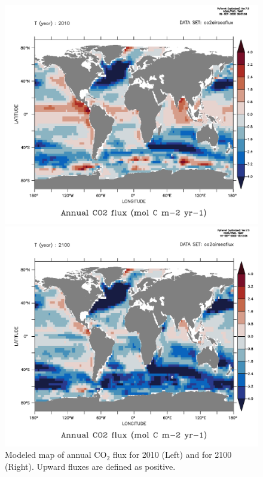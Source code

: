 \documentclass[a4paper]{article}
\begin{document}
\begin{enumerate}
\begin{figure}[h!]   %
   \centering
   \begin{minipage}{0.45\columnwidth}
      \centering
      \includegraphics[width=\columnwidth]{airseaflux2010.pdf}
   \end{minipage}
   \begin{minipage}{0.45\columnwidth}
      \centering
      \includegraphics[width=\columnwidth]{airseaflux2100.pdf}
   \end{minipage}
   \caption[]{Modeled map of annual $\mathrm{CO_{2}}$ flux for 2010 (Left) and for 2100 (Right). Upward fluxes are defined as positive.}
   \label{fig:airseamap}
\end{figure}


\end{enumerate}
\end{document}
